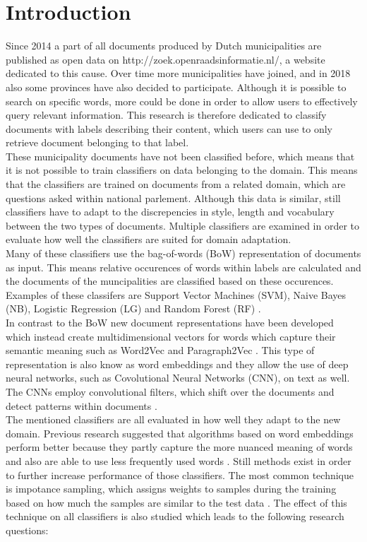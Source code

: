 \section{Introduction}
\label{sec:intro}
Since 2014 a part of all documents produced by Dutch municipalities are published as open data on http://zoek.openraadsinformatie.nl/, a website dedicated to this cause. Over time more municipalities have joined, and in 2018 also some provinces have also decided to participate. Although it is possible to search on specific words, more could be done in order to allow users to effectively query relevant information. This research is therefore dedicated to classify documents with labels describing their content, which users can use to only retrieve document belonging to that label.\\
These municipality documents have not been classified before, which means that it is not possible to train classifiers on data belonging to the domain. This means that the classifiers are trained on documents from a related domain, which are questions asked within national parlement. Although this data is similar, still classifiers have to adapt to the discrepencies in style, length and vocabulary between the two types of documents. Multiple classifiers are examined in order to evaluate how well the classifiers are suited for domain adaptation.\\
Many of these classifiers use the bag-of-words (BoW) representation of documents as input. This means relative occurences of words within labels are calculated and the documents of the muncipalities are classified based on these occurences. Examples of these classifers are Support Vector Machines (SVM), Naive Bayes (NB), Logistic Regression (LG) and Random Forest (RF) \cite{aggarwal2012survey}. \\
In contrast to the BoW new document representations have been developed which instead create multidimensional vectors for words which capture their semantic meaning such as Word2Vec \cite{mikolov2013efficient} and Paragraph2Vec \cite{le2014distributed}. This type of representation is also know as word embeddings and they allow the use of deep neural networks, such as Covolutional Neural Networks (CNN), on text as well. The CNNs employ convolutional filters, which shift over the documents and detect patterns within documents \cite{kim2014convolutional} \cite{kalchbrenner2014convolutional}.\\
The mentioned classifiers are all evaluated in how well they adapt to the new domain. Previous research suggested that algorithms based on word embeddings perform better because they partly capture the more nuanced meaning of words and also are able to use less frequently used words \cite{nguyen2015event} \cite{mou2016transferable}. Still methods exist in order to further increase performance of those classifiers. The most common technique is impotance sampling, which assigns weights to samples during the training based on how much the samples are similar to the test data \cite{pan2010survey}. The effect of this technique on all classifiers is also studied which leads to the following research questions:\\
